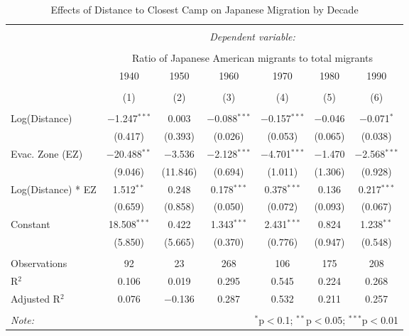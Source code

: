 
\begin{table}[!htbp] \centering 
  \caption{Effects of Distance to Closest Camp on Japanese Migration by Decade} 
  \label{ezdistreg} 
\begin{tabular}{@{\extracolsep{2pt}}lcccccc} 
\\[-1.8ex]\hline 
\hline \\[-1.8ex] 
 & \multicolumn{6}{c}{\textit{Dependent variable:}} \\ 
\cline{2-7} 
\\[-1.8ex] & \multicolumn{6}{c}{Ratio of Japanese American migrants to total migrants} \\ 
 & 1940 & 1950 & 1960 & 1970 & 1980 & 1990 \\ 
\\[-1.8ex] & (1) & (2) & (3) & (4) & (5) & (6)\\ 
\hline \\[-1.8ex] 
 Log(Distance) & $-$1.247$^{***}$ & 0.003 & $-$0.088$^{***}$ & $-$0.157$^{***}$ & $-$0.046 & $-$0.071$^{*}$ \\ 
  & (0.417) & (0.393) & (0.026) & (0.053) & (0.065) & (0.038) \\ 
  Evac. Zone (EZ) & $-$20.488$^{**}$ & $-$3.536 & $-$2.128$^{***}$ & $-$4.701$^{***}$ & $-$1.470 & $-$2.568$^{***}$ \\ 
  & (9.046) & (11.846) & (0.694) & (1.011) & (1.306) & (0.928) \\ 
  Log(Distance) * EZ  & 1.512$^{**}$ & 0.248 & 0.178$^{***}$ & 0.378$^{***}$ & 0.136 & 0.217$^{***}$ \\ 
  & (0.659) & (0.858) & (0.050) & (0.072) & (0.093) & (0.067) \\ 
  Constant & 18.508$^{***}$ & 0.422 & 1.343$^{***}$ & 2.431$^{***}$ & 0.824 & 1.238$^{**}$ \\ 
  & (5.850) & (5.665) & (0.370) & (0.776) & (0.947) & (0.548) \\ 
 \hline \\[-1.8ex] 
Observations & 92 & 23 & 268 & 106 & 175 & 208 \\ 
R$^{2}$ & 0.106 & 0.019 & 0.295 & 0.545 & 0.224 & 0.268 \\ 
Adjusted R$^{2}$ & 0.076 & $-$0.136 & 0.287 & 0.532 & 0.211 & 0.257 \\ 
\hline 
\hline \\[-1.8ex] 
\textit{Note:}  


& \multicolumn{6}{r}{$^{*}$p$<$0.1; $^{**}$p$<$0.05; $^{***}$p$<$0.01} \\ 
\end{tabular} 
\end{table} 
